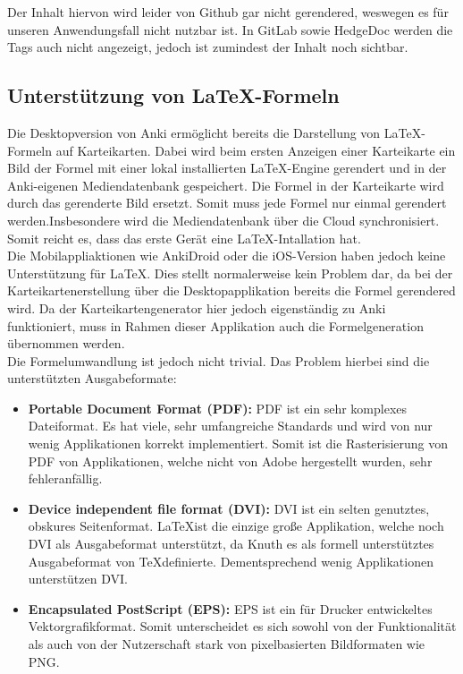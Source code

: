 \documentclass[ngerman]{article}
\begin{document}
Der Inhalt hiervon wird leider von Github gar nicht gerendered, weswegen es für unseren Anwendungsfall nicht nutzbar ist. In GitLab sowie HedgeDoc werden die Tags auch nicht angezeigt, jedoch ist zumindest der Inhalt noch sichtbar.

\subsection{Unterst\"utzung von \LaTeX-Formeln}
Die Desktopversion von Anki ermöglicht bereits die Darstellung von \LaTeX-Formeln auf Karteikarten. Dabei wird beim ersten Anzeigen einer Karteikarte ein Bild der Formel mit einer lokal installierten \LaTeX-Engine gerendert und in der Anki-eigenen Mediendatenbank gespeichert. Die Formel in der Karteikarte wird durch das gerenderte Bild ersetzt. Somit muss jede Formel nur einmal gerendert werden.Insbesondere wird die Mediendatenbank über die Cloud synchronisiert. Somit reicht es, dass das erste Gerät eine \LaTeX-Intallation hat.\\

Die Mobilappliaktionen wie AnkiDroid oder die iOS-Version haben jedoch keine Unterstützung für \LaTeX. Dies stellt normalerweise kein Problem dar, da bei der Karteikartenerstellung über die Desktopapplikation bereits die Formel gerendered wird. Da der Karteikartengenerator hier jedoch eigenständig zu Anki funktioniert, muss in Rahmen dieser Applikation auch die Formelgeneration übernommen werden.\\

Die Formelumwandlung ist jedoch nicht trivial. Das Problem hierbei sind die unterstützten Ausgabeformate:
\begin{itemize}
  \item \textbf{Portable Document Format (PDF):} PDF ist ein sehr komplexes Dateiformat. Es hat viele, sehr umfangreiche Standards und wird von nur wenig Applikationen korrekt implementiert. Somit ist die Rasterisierung von PDF von Applikationen, welche nicht von Adobe hergestellt wurden, sehr fehleranfällig.
  \item \textbf{Device independent file format (DVI):} DVI ist ein selten genutztes, obskures Seitenformat. \LaTeX ist die einzige große Applikation, welche noch DVI als Ausgabeformat unterstützt, da Knuth es als formell unterstütztes Ausgabeformat von \TeX definierte. Dementsprechend wenig Applikationen unterstützen DVI.
  \item \textbf{Encapsulated PostScript (EPS):} EPS ist ein für Drucker entwickeltes Vektorgrafikformat. Somit unterscheidet es sich sowohl von der Funktionalität als auch von der Nutzerschaft stark von pixelbasierten Bildformaten wie PNG.
\end{itemize}
\end{document}
